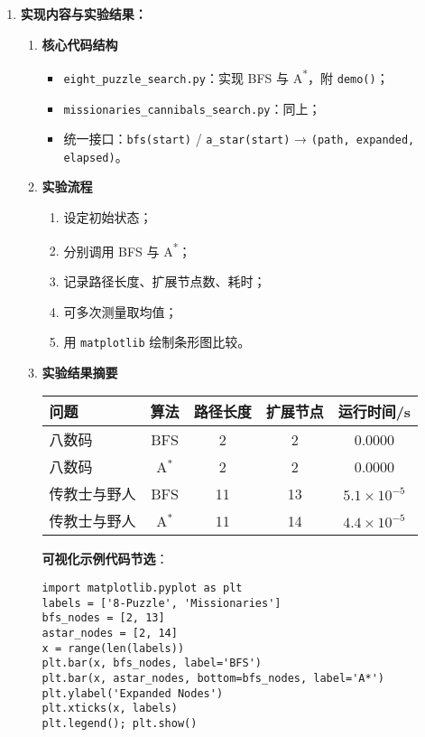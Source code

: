 \documentclass[UTF8]{ctexart}
\begin{document}
\begin{enumerate}
  \item \textbf{实现内容与实验结果：}
  \begin{enumerate}[label=(\alph*)]
    \item \textbf{核心代码结构}
      \begin{itemize}
        \item \verb|eight_puzzle_search.py|：实现 BFS 与 A\textsuperscript{*}，附 \verb|demo()|；
        \item \verb|missionaries_cannibals_search.py|：同上；
        \item 统一接口：\verb|bfs(start)| / \verb|a_star(start)| → \verb|(path, expanded, elapsed)|。
      \end{itemize}
    \item \textbf{实验流程}
      \begin{enumerate}[label=\roman*.]
        \item 设定初始状态；
        \item 分别调用 BFS 与 A\textsuperscript{*}；
        \item 记录路径长度、扩展节点数、耗时；
        \item 可多次测量取均值；
        \item 用 \texttt{matplotlib} 绘制条形图比较。
      \end{enumerate}
    \item \textbf{实验结果摘要}
      \begin{center}
        \begin{tabular}{lcccc}
          \hline
          \textbf{问题} & \textbf{算法} & \textbf{路径长度} & \textbf{扩展节点} & \textbf{运行时间/s} \\
          \hline
          八数码 & BFS & 2 & 2 & 0.0000 \\
          八数码 & A$^{*}$ & 2 & 2 & 0.0000 \\
          传教士与野人 & BFS & 11 & 13 & $5.1\times10^{-5}$ \\
          传教士与野人 & A$^{*}$ & 11 & 14 & $4.4\times10^{-5}$ \\
          \hline
        \end{tabular}
      \end{center}
\vspace{0.5em}
\noindent
\textbf{可视化示例代码节选}：
\begin{verbatim}
import matplotlib.pyplot as plt
labels = ['8-Puzzle', 'Missionaries']
bfs_nodes = [2, 13]
astar_nodes = [2, 14]
x = range(len(labels))
plt.bar(x, bfs_nodes, label='BFS')
plt.bar(x, astar_nodes, bottom=bfs_nodes, label='A*')
plt.ylabel('Expanded Nodes')
plt.xticks(x, labels)
plt.legend(); plt.show()
\end{verbatim}
  \end{enumerate}
\end{enumerate}
\end{document}
